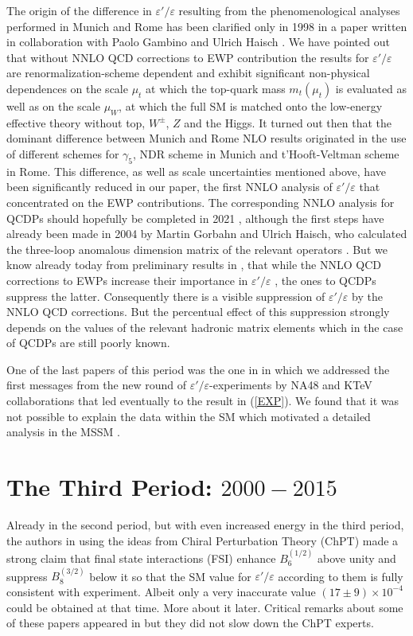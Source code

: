 \documentclass[12pt,a4paper]{article}
\newcommand{\bsi}{B_6^{(1/2)}}
\newcommand{\bei}{B_8^{(3/2)}}
\def\epe{\varepsilon'/\varepsilon}
\begin{document}
The origin of the difference in $\epe$ resulting from the phenomenological analyses performed in Munich and Rome has been clarified only in 1998 in
a paper written in collaboration with Paolo Gambino and Ulrich Haisch \cite{Buras:1999st}. We have pointed out that without NNLO QCD corrections to EWP contribution the results for $\epe$ are renormalization-scheme dependent and exhibit significant non-physical dependences on the scale $\mu_t$ at which the top-quark mass $m_t(\mu_t)$ is evaluated as well as on the scale $\mu_W$, at which the
full SM is matched onto  the low-energy  effective theory without top, $W^\pm$, $Z$ and
the Higgs. 
It turned out then that the dominant difference between Munich and Rome
NLO results originated in the use of different schemes for $\gamma_5$, NDR
scheme in Munich and t'Hooft-Veltman scheme in Rome. This difference,
as well as scale uncertainties mentioned above,
have been significantly reduced in our paper,  the first NNLO analysis of $\epe$ that concentrated on the EWP contributions. The corresponding
NNLO analysis for QCDPs should hopefully be completed  in 2021 \cite{Cerda-Sevilla:2016yzo,Cerda-Sevilla:2018hjk}, although the
first steps have already been made in 2004 by Martin Gorbahn and Ulrich Haisch,
who calculated the three-loop anomalous dimension matrix of the relevant operators \cite{Gorbahn:2004my}. But we know already today from preliminary results in
 \cite{Cerda-Sevilla:2016yzo,Cerda-Sevilla:2018hjk},
 that while the NNLO QCD corrections to EWPs increase their importance
 in $\epe$  \cite{Buras:1999st}, the ones to QCDPs suppress
the latter. Consequently there is a visible suppression of $\epe$ by the NNLO
QCD corrections. But the percentual effect of this suppression strongly depends
on the values of the relevant hadronic matrix elements which in the case of
QCDPs are still poorly known.

One of the last papers of this period was the one in \cite{Bosch:1999wr} in
which we addressed the first messages from the new round of $\epe$-experiments by NA48 and KTeV collaborations that led eventually to the result in (\ref{EXP}). We found that
it was not possible to explain the data within the SM which motivated a detailed analysis in the MSSM \cite{Buras:2000qz}.



\boldmath
\section{The Third Period: $2000-2015$}\label{P3}
\unboldmath
Already in the second period, but with even increased energy in the third period,
the authors in \cite{Antonelli:1995gw,Bertolini:1995tp,Pallante:1999qf,Pallante:2000hk,Buchler:2001np,Buchler:2001nm,Pallante:2001he}  using 
the ideas from Chiral Perturbation Theory (ChPT) made a strong claim 
that final state interactions (FSI)  enhance $\bsi$ above unity and suppress 
$\bei$ below it so that the SM value for $\epe$ according to them 
is fully consistent with experiment.
Albeit only a very inaccurate value $(17\pm9)\times 10^{-4}$ \cite{Pallante:2001he}   could be obtained at that time. 
More about it later. Critical remarks about some of these  papers appeared in \cite{Buras:2000kx} but they did not slow down the ChPT experts.
\end{document}
